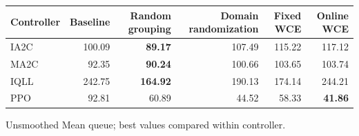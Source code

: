 \begin{tabular}{lrrrrr}
\hline
Controller & Baseline & Random grouping & Domain randomization & Fixed WCE & Online WCE \\
\hline
IA2C & 100.09 & \textbf{89.17} & 107.49 & 115.22 & 117.12 \\
MA2C & 92.35 & \textbf{90.24} & 100.66 & 103.65 & 103.74 \\
IQLL & 242.75 & \textbf{164.92} & 190.13 & 174.14 & 244.21 \\
PPO & 92.81 & 60.89 & 44.52 & 58.33 & \textbf{41.86} \\
\hline
\end{tabular}
Unsmoothed Mean queue; best values compared within controller.

